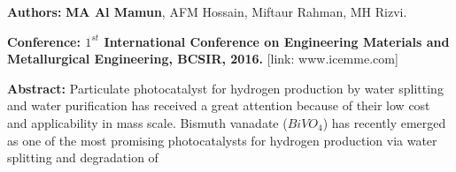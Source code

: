 \documentclass[a4paper,20pt]{article}
\begin{document}
\textbf{Authors:} \textbf{MA Al Mamun}, AFM Hossain, Miftaur Rahman, MH Rizvi. \\ \vspace{3pt}

\textbf{Conference: $1^{st}$ International Conference on Engineering Materials and
Metallurgical Engineering, BCSIR, 2016.} [link: www.icemme.com] \\ \vspace{5pt}

\textbf{Abstract:} Particulate photocatalyst for hydrogen production by water splitting and water purification has received a great attention because of their low cost and applicability in mass scale. Bismuth vanadate ($BiVO_4$) has recently emerged as one of the most promising photocatalysts for hydrogen production via water splitting and degradation of \\ \vspace{2pt}
\end{document}
